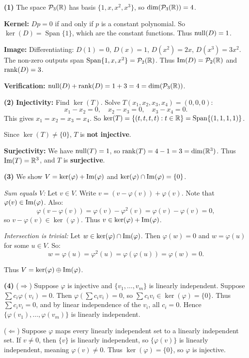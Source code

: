 \documentclass{report}
\begin{document}
\begin{solution}
\textbf{(1)} The space \(\mcP_3(\RR)\) has basis \(\{1, x, x^2, x^3\}\), so \(\dim(\mcP_3(\RR)) = 4\).

\textbf{Kernel:} \(Dp = 0\) if and only if \(p\) is a constant polynomial. So \(\ker(D) = \operatorname{Span}\{1\}\), which are the constant functions. Thus \(\operatorname{null}(D) = 1\).

\textbf{Image:} Differentiating: \(D(1) = 0\), \(D(x) = 1\), \(D(x^2) = 2x\), \(D(x^3) = 3x^2\). The non-zero outputs span \(\operatorname{Span}\{1, x, x^2\} = \mcP_2(\RR)\). Thus \(\Img(D) = \mcP_2(\RR)\) and \(\operatorname{rank}(D) = 3\).

\textbf{Verification:} \(\nullity(D) + \rank(D) = 1 + 3 = 4 = \dim(\mcP_3(\RR))\). \checkmark

\textbf{(2)} \textbf{Injectivity:} Find \(\ker(T)\). Solve \(T(x_1, x_2, x_3, x_4) = (0, 0, 0)\):
\[x_1 - x_2 = 0, \quad x_2 - x_3 = 0, \quad x_3 - x_4 = 0.\]
This gives \(x_1 = x_2 = x_3 = x_4\). So \(\ker(T) = \{(t, t, t, t) : t \in \RR\} = \operatorname{Span}\{(1, 1, 1, 1)\}\).

Since \(\ker(T) \neq \{0\}\), \(T\) is \textbf{not injective}.

\textbf{Surjectivity:} We have \(\operatorname{null}(T) = 1\), so \(\rank(T) = 4 - 1 = 3 = \dim(\RR^3)\). Thus \(\Img(T) = \RR^3\), and \(T\) is \textbf{surjective}.

\textbf{(3)} We show \(V = \ker(\varphi) + \operatorname{Im}(\varphi)\) and \(\ker(\varphi) \cap \operatorname{Im}(\varphi) = \{0\}\).

\emph{Sum equals \(V\):} Let \(v \in V\). Write \(v = (v - \varphi(v)) + \varphi(v)\). Note that \(\varphi(v) \in \operatorname{Im}(\varphi)\). Also:
\[\varphi(v - \varphi(v)) = \varphi(v) - \varphi^2(v) = \varphi(v) - \varphi(v) = 0,\]
so \(v - \varphi(v) \in \ker(\varphi)\). Thus \(v \in \ker(\varphi) + \operatorname{Im}(\varphi)\).

\emph{Intersection is trivial:} Let \(w \in \ker(\varphi) \cap \operatorname{Im}(\varphi)\). Then \(\varphi(w) = 0\) and \(w = \varphi(u)\) for some \(u \in V\). So:
\[w = \varphi(u) = \varphi^2(u) = \varphi(\varphi(u)) = \varphi(w) = 0.\]

Thus \(V = \ker(\varphi) \oplus \operatorname{Im}(\varphi)\).

\textbf{(4)} (\(\Rightarrow\)) Suppose \(\varphi\) is injective and \(\{v_1, \ldots, v_m\}\) is linearly independent. Suppose \(\sum c_i \varphi(v_i) = 0\). Then \(\varphi(\sum c_i v_i) = 0\), so \(\sum c_i v_i \in \ker(\varphi) = \{0\}\). Thus \(\sum c_i v_i = 0\), and by linear independence of the \(v_i\), all \(c_i = 0\). Hence \(\{\varphi(v_1), \ldots, \varphi(v_m)\}\) is linearly independent.

(\(\Leftarrow\)) Suppose \(\varphi\) maps every linearly independent set to a linearly independent set. If \(v \neq 0\), then \(\{v\}\) is linearly independent, so \(\{\varphi(v)\}\) is linearly independent, meaning \(\varphi(v) \neq 0\). Thus \(\ker(\varphi) = \{0\}\), so \(\varphi\) is injective.
\end{solution}
\end{document}
